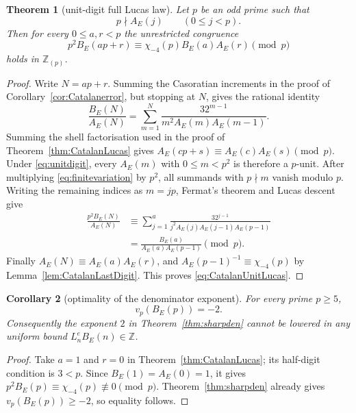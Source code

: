 \documentclass[11pt]{article}
\newtheorem{theorem}{Theorem}[section]
\newtheorem{corollary}[theorem]{Corollary}
\theoremstyle{definition}
\theoremstyle{remark}
\newcommand{\Zp}{\mathbb Z_{(p)}}
\begin{document}
\begin{theorem}[unit-digit full Lucas law]\label{thm:CatalanUnitLucas}
Let $p$ be an odd prime such that
\begin{equation}\label{eq:unitdigit}
 p\nmid A_E(j)\qquad(0\le j<p).
\end{equation}
Then for every $0\le a,r<p$ the unrestricted congruence
\begin{equation}\label{eq:CatalanUnitLucas}
 p^2B_E(ap+r)\equiv
 \chi_{-4}(p)B_E(a)A_E(r)\pmod p
\end{equation}
holds in $\Zp$.
\end{theorem}

\begin{proof}
Write $N=ap+r$.  Summing the Casoratian increments in the proof of
Corollary~\ref{cor:Catalanerror}, but stopping at $N$, gives the rational identity
\begin{equation}\label{eq:finitevariation}
 \frac{B_E(N)}{A_E(N)}=
 \sum_{m=1}^{N}\frac{32^{m-1}}{m^2A_E(m)A_E(m-1)}.
\end{equation}
Summing the shell factorisation used in the proof of
Theorem~\ref{thm:CatalanLucas} gives
$A_E(cp+s)\equiv A_E(c)A_E(s)\pmod p$.  Under \eqref{eq:unitdigit}, every
$A_E(m)$ with $0\le m<p^2$ is therefore a $p$-unit.  After multiplying
\eqref{eq:finitevariation} by $p^2$, all summands with $p\nmid m$ vanish modulo
$p$.  Writing the remaining indices as $m=jp$, Fermat's theorem and Lucas descent give
\begin{align*}
 \frac{p^2B_E(N)}{A_E(N)}
 &\equiv \sum_{j=1}^{a}
 \frac{32^{j-1}}{j^2A_E(j)A_E(j-1)A_E(p-1)}\\
 &=\frac{B_E(a)}{A_E(a)A_E(p-1)}\pmod p.
\end{align*}
Finally $A_E(N)\equiv A_E(a)A_E(r)$, and
$A_E(p-1)^{-1}\equiv\chi_{-4}(p)$ by
Lemma~\ref{lem:CatalanLastDigit}.  This proves \eqref{eq:CatalanUnitLucas}.
\end{proof}

\begin{corollary}[optimality of the denominator exponent]\label{cor:denoptimal}
For every prime $p\ge5$,
\begin{equation}\label{eq:vpBp}
 v_p(B_E(p))=-2.
\end{equation}
Consequently the exponent $2$ in Theorem~\ref{thm:sharpden} cannot be lowered in any
uniform bound $L_n^eB_E(n)\in\mathbb Z$.
\end{corollary}

\begin{proof}
Take $a=1$ and $r=0$ in Theorem~\ref{thm:CatalanLucas}; its half-digit condition is
$3<p$.  Since $B_E(1)=A_E(0)=1$, it gives
$p^2B_E(p)\equiv\chi_{-4}(p)\not\equiv0\pmod p$.  Theorem~\ref{thm:sharpden}
already gives $v_p(B_E(p))\ge-2$, so equality follows.
\end{proof}
\end{document}
